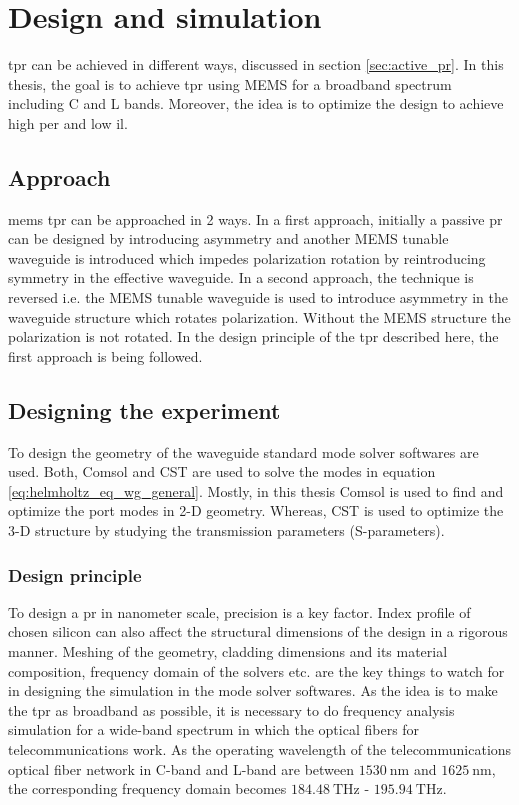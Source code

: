 \documentclass[../report.tex]{subfiles}
\begin{document}
	

\chapter{Design and simulation}
\gls{tpr} can be achieved in different ways, discussed in section \ref*{sec:active_pr}. In this thesis, the goal is to achieve \gls{tpr} using MEMS for a broadband spectrum including C and L bands. Moreover, the idea is to optimize the design to achieve high \gls{per} and low \gls{il}.  
	
	\section{Approach}
	\gls{mems} \gls{tpr} can be approached in 2 ways. In a first approach, initially a passive \gls{pr} can be designed by introducing asymmetry and another MEMS tunable waveguide is introduced which impedes polarization rotation by reintroducing symmetry in the effective waveguide. In a second approach, the technique is reversed i.e. the MEMS tunable waveguide is used to introduce asymmetry in the waveguide structure which rotates polarization. Without the MEMS structure the polarization is not rotated. In the design principle of the \gls{tpr} described here, the first approach is being followed.  
	
	\section{Designing the experiment}
	To design the geometry of the waveguide standard mode solver softwares are used. Both, Comsol\cite{comsol_2015} and CST \cite{cst_2015} are used to solve the modes in equation \ref{eq:helmholtz_eq_wg_general}. Mostly, in this thesis Comsol is used to find and optimize the port modes in 2-D geometry. Whereas, CST is used to optimize the 3-D structure by studying the transmission parameters (S-parameters).
	
		
		\subsection{Design principle}
To design a \gls{pr} in nanometer scale, precision is a key factor. Index profile of chosen silicon can also affect the structural dimensions of the design in a rigorous manner. Meshing of the geometry, cladding dimensions and its material composition, frequency domain of the solvers etc. are the key things to watch for in designing the simulation in the mode solver softwares. As the idea is to make the \gls{tpr} as broadband as possible, it is necessary to do frequency analysis simulation for a wide-band spectrum in which the optical fibers for telecommunications work. As the operating wavelength of the telecommunications optical fiber network in C-band and L-band are between $\SI{1530}{\nano\metre}$ and $\SI{1625}{\nano\metre}$, the corresponding frequency domain becomes $\SI{184.48}{\THz}$ - $\SI{195.94}{\THz}$.
	
\end{document}
